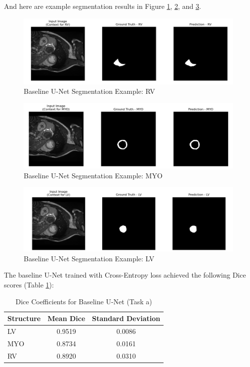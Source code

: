 \documentclass{article}
\begin{document}
And here are example segmentation results in Figure \ref{fig:baseline_unet_segmentation_example_lv},
\ref{fig:baseline_unet_segmentation_example_myo}, and \ref{fig:baseline_unet_segmentation_example_rv}.
\begin{figure}[H]
  \centering
  \includegraphics[width=\linewidth]{../result/for_ppt/baseline_RV.png}
  \caption{Baseline U-Net Segmentation Example: RV}
  \label{fig:baseline_unet_segmentation_example_lv}
\end{figure}
\begin{figure}[H]
  \centering
  \includegraphics[width=\linewidth]{../result/for_ppt/baseline_MYO.png}
  \caption{Baseline U-Net Segmentation Example: MYO}
  \label{fig:baseline_unet_segmentation_example_myo}
\end{figure}
\begin{figure}[H]
  \centering
  \includegraphics[width=\linewidth]{../result/for_ppt/baseline_LV.png}
  \caption{Baseline U-Net Segmentation Example: LV}
  \label{fig:baseline_unet_segmentation_example_rv}
\end{figure}

The baseline U-Net trained with Cross-Entropy loss achieved the following Dice scores (Table \ref{tab:baseline_unet}):
\begin{table}[H]
  \centering
  \caption{Dice Coefficients for Baseline U-Net (Task a)}
  \label{tab:baseline_unet}
  \begin{tabular}{lcc}
    \toprule
    Structure & Mean Dice & Standard Deviation \\
    \midrule
    LV        & 0.9519    & 0.0086             \\
    MYO       & 0.8734    & 0.0161             \\
    RV        & 0.8920    & 0.0310             \\
    \bottomrule
  \end{tabular}
\end{table}
\end{document}
